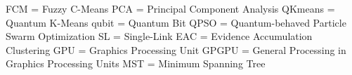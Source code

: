 FCM = Fuzzy C-Means
PCA = Principal Component Analysis
QKmeans = Quantum K-Means
qubit = Quantum Bit
QPSO = Quantum-behaved Particle Swarm Optimization
SL = Single-Link
EAC = Evidence Accumulation Clustering
GPU = Graphics Processing Unit
GPGPU = General Processing in Graphics Processing Units
MST = Minimum Spanning Tree
